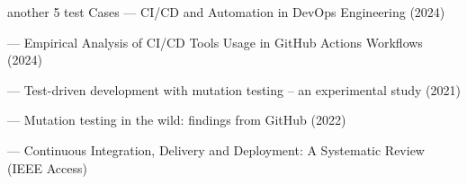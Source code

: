 \documentclass[12pt]{article}
\begin{document}
\cite{Ponzanelli2014miningstac}


\cite{Vasilescu2015qualityand}


\cite{Kovac2014ehealthdem}

\cite{Ma2017howdodevel}


another 5 test Cases 
\cite{Chava2024cicdandaut}
 — CI/CD and Automation in DevOps Engineering (2024)

\cite{Faqih2024empiricala}
 — Empirical Analysis of CI/CD Tools Usage in GitHub Actions Workflows (2024)

\cite{Roman2021testdriven}
 — Test-driven development with mutation testing – an experimental study (2021)

\cite{Sánchez2022mutationte}
 — Mutation testing in the wild: findings from GitHub (2022)

\cite{Shahin2017continuous}
 — Continuous Integration, Delivery and Deployment: A Systematic Review (IEEE Access)
\end{document}
